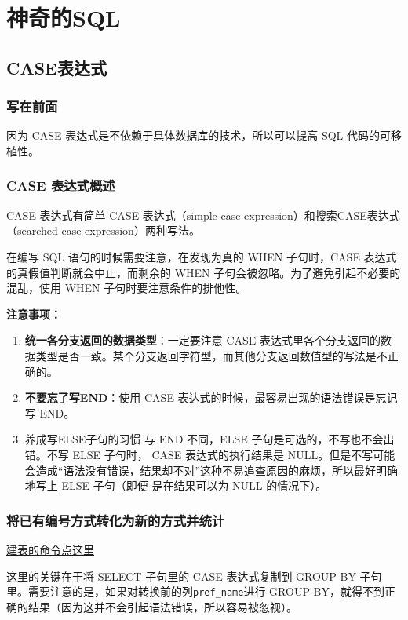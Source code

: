 \chapter{神奇的SQL}
\section{CASE表达式}
\subsection{写在前面}
因为 CASE 表达式是不依赖于具体数据库的技术，所以可以提高 SQL 代码的可移植性。
\subsection{CASE 表达式概述}
CASE 表达式有简单 CASE 表达式（simple case expression）和搜索CASE表达式（searched case expression）两种写法。

在编写 SQL 语句的时候需要注意，在发现为真的 WHEN 子句时，CASE 表达式的真假值判断就会中止，而剩余的 WHEN 子句会被忽略。为了避免引起不必要的混乱，使用 WHEN 子句时要注意条件的排他性。

\textbf{注意事项：}

\begin{enumerate}
      \item \textbf{统一各分支返回的数据类型}：一定要注意 CASE 表达式里各个分支返回的数据类型是否一致。某个分支返回字符型，而其他分支返回数值型的写法是不正确的。
      \item \textbf{不要忘了写END}：使用 CASE 表达式的时候，最容易出现的语法错误是忘记写 END。

      \item 养成写ELSE子句的习惯
            与 END 不同，ELSE 子句是可选的，不写也不会出错。不写 ELSE 子句时，
            CASE 表达式的执行结果是 NULL。但是不写可能会造成“语法没有错误，结果却不对”这种不易追查原因的麻烦，所以最好明确地写上 ELSE 子句（即便
            是在结果可以为 NULL 的情况下）。

\end{enumerate}


\subsection{将已有编号方式转化为新的方式并统计}

\href{https://github.com/JPL-JUNO/SQL/blob/main/ASQLP/PopTbl.sql}{建表的命令点这里}

这里的关键在于将 SELECT 子句里的 CASE 表达式复制到 GROUP BY
子句里。需要注意的是，如果对转换前的列\verb|pref_name|进行 GROUP
BY，就得不到正确的结果（因为这并不会引起语法错误，所以容易被忽视）。

